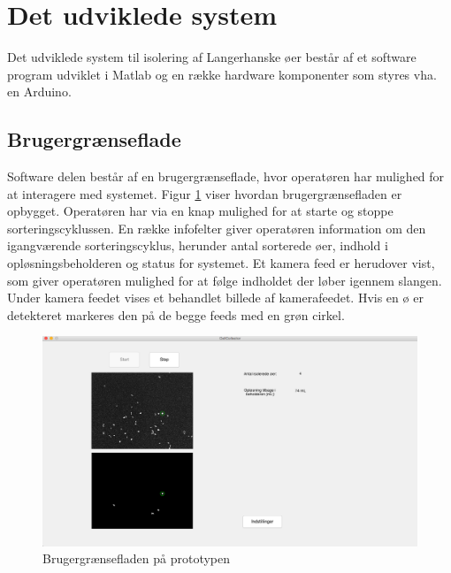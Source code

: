 \section{Det udviklede system}
Det udviklede system til isolering af Langerhanske øer består af et software program udviklet i Matlab og en række hardware komponenter som styres vha. en Arduino.


 
\subsection{Brugergrænseflade}
Software delen består af en brugergrænseflade, hvor operatøren har mulighed for at interagere med systemet. Figur \ref{fig:finalgui} viser hvordan brugergrænsefladen er opbygget. Operatøren har via en knap mulighed for at starte og stoppe sorteringscyklussen. En række infofelter giver operatøren information om den igangværende sorteringscyklus, herunder antal sorterede øer, indhold i opløsningsbeholderen og status for systemet. Et kamera feed er herudover vist, som giver operatøren mulighed for at følge indholdet der løber igennem slangen. Under kamera feedet vises et behandlet billede af kamerafeedet. Hvis en ø er detekteret markeres den på de begge feeds med en grøn cirkel.

 \begin{figure}[H]
	\centering
	\includegraphics[width=1\textwidth]{billeder/gui_main.png}
	\caption{Brugergrænsefladen på prototypen}
	\label{fig:finalgui}
\end{figure}